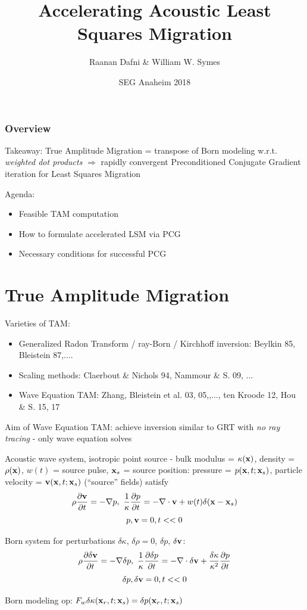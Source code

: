\documentclass[xcolor=dvipsnames,12pt,aspectratio=169]{beamer}
\title[]{Accelerating Acoustic Least Squares Migration}
\author[]{Raanan Dafni \& William W. Symes}
\institute[]{The Rice Inversion Project\\Computational and Applied Mathematics\\Rice University}
\date{SEG Anaheim 2018}
\begin{document}
\frame{
\titlepage
}

\begin{frame}\frametitle{Overview}

Takeaway:  {\color{blue}T}rue {\color{blue}A}mplitude {\color{blue}M}igration = transpose of Born modeling w.r.t. {\em weighted dot products} $\Rightarrow$ rapidly convergent {\color{blue}P}reconditioned {\color{blue}C}onjugate {\color{blue}G}radient iteration for {\color{blue}L}east {\color{blue}S}quares {\color{blue}M}igration

Agenda:
\begin{itemize}
\item Feasible TAM computation 
\item How to formulate accelerated LSM via PCG
\item Necessary conditions for successful PCG
\end{itemize}
\end{frame}

\section{True Amplitude Migration}

\begin{frame}
Varieties of TAM:

\begin{itemize}
\item Generalized Radon Transform / ray-Born / Kirchhoff inversion: Beylkin 85, Bleistein 87,....
\item Scaling methods: Claerbout \& Nichols 94, Nammour \& S. 09, ...
\item {\color{blue}Wave Equation TAM}: Zhang, Bleistein et al. 03, 05,,..., ten Kroode 12, Hou \& S. 15, 17
\end{itemize}

Aim of Wave Equation TAM: achieve inversion similar to GRT with {\em no ray tracing} - only wave equation solves
\end{frame}

\begin{frame}
Acoustic wave system, isotropic point source - bulk modulus = $\kappa(\mathbf{x})$, density = $\rho(\mathbf{x})$, $w(t)$ = source pulse, $\mathbf{x}_s$ = source position: pressure = $p(\mathbf{x},t;\mathbf{x}_s)$, particle velocity = $\mathbf{v}(\mathbf{x},t;\mathbf{x}_s)$ (``source'' fields) satisfy
\[
\rho \frac{\partial \mathbf{v}}{\partial t} = - \nabla p,\,\,
\frac{1}{\kappa}\frac{\partial p}{\partial t} = - \nabla \cdot \mathbf{v} + w(t)\delta(\mathbf{x}-\mathbf{x}_s)
\]
\[
p, \mathbf{v} = 0, t<<0
\]

Born system for perturbations $\delta \kappa$, {\color{blue} $\delta \rho = 0$}, $\delta p$, $\delta \mathbf{v}$:
\[
\rho \frac{\partial \delta \mathbf{v}}{\partial t} = - \nabla \delta p,\,\,
\frac{1}{\kappa}\frac{\partial \delta p}{\partial t} = - \nabla \cdot \delta \mathbf{v} + \frac{\delta \kappa}{\kappa^2} \frac{\partial p}{\partial t} 
\]
\[
\delta p, \delta \mathbf{v} = 0, t << 0
\]

Born modeling op: $F_w \delta \kappa (\mathbf{x}_r,t; \mathbf{x}_s) = \delta p(\mathbf{x}_r,t;\mathbf{x}_s) $ 
\end{frame}
\end{document}
